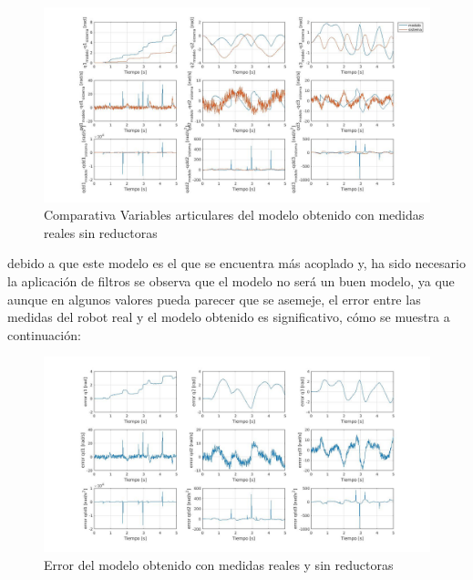 \begin{figure}[h!]
	
	\centering
	
	\includegraphics[width=1\textwidth]{EstimacParam_SisMod_In1_RealSR}
	
	\caption{Comparativa Variables articulares del modelo obtenido con medidas reales sin reductoras}
	
\end{figure}



\newpage

debido a que este modelo es el que se encuentra más acoplado y, ha sido necesario la aplicación de filtros se observa que el modelo no será un buen modelo, ya que aunque en algunos valores pueda parecer que se asemeje, el error entre las medidas del robot real y el modelo obtenido es significativo, cómo se muestra a continuación:



\begin{figure}[h!]
	
	\centering
	
	\includegraphics[width=1\textwidth]{EstimacParam_SisModError_In1_RealSR}
	
	\caption{Error del modelo obtenido con medidas reales y sin reductoras}
	
\end{figure}



